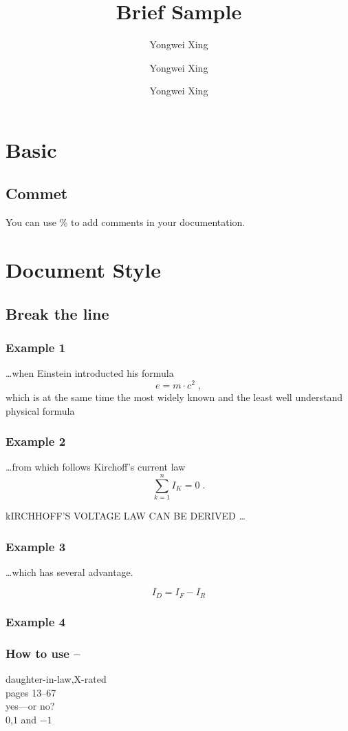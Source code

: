\documentclass[a4paper,11pt]{article}
\title{Brief Sample}
\author{Yongwei Xing \and Yongwei Xing \and Yongwei Xing}
\begin{document}
\maketitle
\tableofcontents
\section{Basic}
\subsection{Commet}
You can use \%{} to add comments in your documentation.
\section{Document Style}
\subsection{Break the line}
\subsubsection{Example 1}
\ldots when Einstein introducted his formula
\begin{equation}
e = m \cdot c^2 \; ,
\end{equation}
which is at the same time the most widely known and the least well understand physical formula
\subsubsection{Example 2}
\ldots from which follows Kirchoff's current law
\begin{equation}
\sum_{k=1}^{n}I_K=0 \; .
\end{equation}

kIRCHHOFF'S VOLTAGE LAW CAN BE DERIVED \ldots
\subsubsection{Example 3}
\ldots which has several advantage.

\begin{equation}
I_D=I_F-I_R
\end{equation}
\subsubsection{Example 4}
\subsubsection{How to use --}
daughter-in-law,X-rated\\
pages 13--67\\
yes---or no?\\
$0$,$1$ and $-1$
\end{document}
